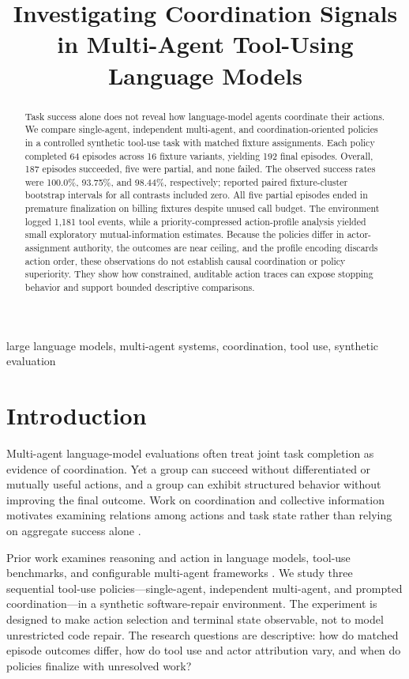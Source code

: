 \documentclass[conference]{IEEEtran}
\title{Investigating Coordination Signals in Multi-Agent Tool-Using Language Models}
\author{\IEEEauthorblockN{Dhruva N}
\IEEEauthorblockA{Department of Artificial Intelligence and Machine Learning\\
Faculty of Engineering, PES University\\
Bengaluru, India}}
\begin{document}
\maketitle

\begin{abstract}
Task success alone does not reveal how language-model agents coordinate their actions. We compare single-agent, independent multi-agent, and coordination-oriented policies in a controlled synthetic tool-use task with matched fixture assignments. Each policy completed 64 episodes across 16 fixture variants, yielding 192 final episodes. Overall, 187 episodes succeeded, five were partial, and none failed. The observed success rates were 100.0\%, 93.75\%, and 98.44\%, respectively; reported paired fixture-cluster bootstrap intervals for all contrasts included zero. All five partial episodes ended in premature finalization on billing fixtures despite unused call budget. The environment logged 1,181 tool events, while a priority-compressed action-profile analysis yielded small exploratory mutual-information estimates. Because the policies differ in actor-assignment authority, the outcomes are near ceiling, and the profile encoding discards action order, these observations do not establish causal coordination or policy superiority. They show how constrained, auditable action traces can expose stopping behavior and support bounded descriptive comparisons.
\end{abstract}

\begin{IEEEkeywords}
large language models, multi-agent systems, coordination, tool use, synthetic evaluation
\end{IEEEkeywords}

\section{Introduction}

Multi-agent language-model evaluations often treat joint task completion as evidence of coordination. Yet a group can succeed without differentiated or mutually useful actions, and a group can exhibit structured behavior without improving the final outcome. Work on coordination and collective information motivates examining relations among actions and task state rather than relying on aggregate success alone \cite{riedl,agashe}.

Prior work examines reasoning and action in language models, tool-use benchmarks, and configurable multi-agent frameworks \cite{yao,api,camel,autogen}. We study three sequential tool-use policies---single-agent, independent multi-agent, and prompted coordination---in a synthetic software-repair environment. The experiment is designed to make action selection and terminal state observable, not to model unrestricted code repair. The research questions are descriptive: how do matched episode outcomes differ, how do tool use and actor attribution vary, and when do policies finalize with unresolved work?
\end{document}
